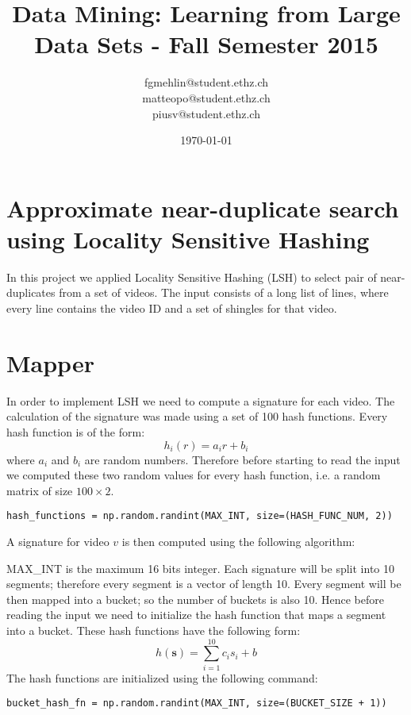 \documentclass[a4paper, 11pt]{article}
\title{Data Mining: Learning from Large Data Sets - Fall Semester 2015}
\author{fgmehlin@student.ethz.ch\\ matteopo@student.ethz.ch\\ piusv@student.ethz.ch\\}
\date{\today}
\begin{document}
\maketitle

\section*{Approximate near-duplicate search using Locality Sensitive Hashing} 
In this project we applied Locality Sensitive Hashing (LSH) to select pair of near-duplicates from a set of videos. The input consists of a long list of lines, where every line contains the video ID and a set of shingles for that video. 
\section{Mapper}
In order to implement LSH we need to compute a signature for each video. The calculation of the signature was made using a set of 100 hash functions. Every hash function is of the form:
\begin{equation}
h_i(r) = a_ir + b_i
\end{equation}
where $a_i$ and $b_i$ are random numbers. Therefore before starting to read the input we computed these two random values for every hash function, i.e. a random matrix of size $100\times 2$.
\begin{lstlisting}
hash_functions = np.random.randint(MAX_INT, size=(HASH_FUNC_NUM, 2))
\end{lstlisting}
A signature for video $v$ is then computed using the following algorithm:
\begin{algorithm}
\end{algorithm}

MAX\_INT is the maximum 16 bits integer. Each signature will be split into 10 segments; therefore every segment is a vector of length 10. Every segment will be then mapped into a bucket; so the number of buckets is also 10. Hence before reading the input we need to initialize the hash function that maps a segment into a bucket. These hash functions have the following form:
\begin{equation}
h(\textbf{s}) = \sum_{i = 1}^{10} c_is_i + b
\end{equation}
The hash functions are initialized using the following command:
\begin{lstlisting}
bucket_hash_fn = np.random.randint(MAX_INT, size=(BUCKET_SIZE + 1))
\end{lstlisting}
\end{document}
